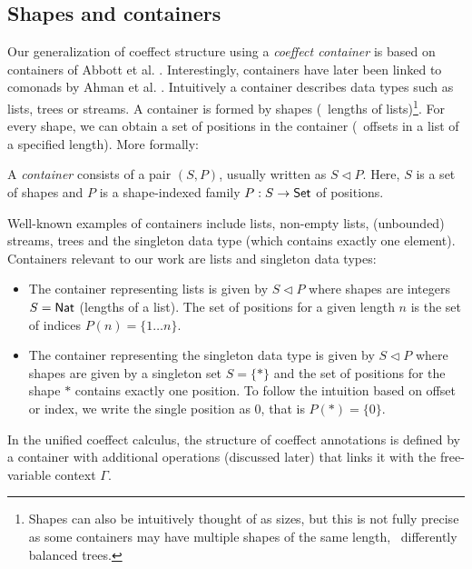 \subsection{Shapes and containers}
Our generalization of coeffect structure using a \emph{coeffect container} is based on containers of
Abbott et al. \cite{types-containers}. Interestingly, containers have later been linked
to comonads by Ahman et al. \cite{comonads-containers}. Intuitively a container describes data
types such as lists, trees or streams. A container is formed by shapes (\eg~lengths of
lists)\footnote{Shapes can also be intuitively thought of as sizes, but this is not fully precise
as some containers may have multiple shapes of the same length, \eg~differently balanced trees.}.
For every shape, we can obtain a set of positions in the container (\eg~offsets in a list of a
specified length). More formally:

\begin{definition}
A \emph{container} consists of a pair $(S,P)$, usually written as $S \triangleleft P$.
Here, $S$ is a set of shapes and $P$ is a shape-indexed family $P : S \rightarrow \textnormal{\sffamily Set}$
of positions.
\end{definition}

\noindent
Well-known examples of containers include lists, non-empty lists, (un\-boun\-ded) streams,
trees and the singleton data type (which contains exactly one element). Containers relevant
to our work are lists and singleton data types:

\begin{itemize}
\item The container representing lists is given by $S \triangleleft P$ where
  shapes are integers $S = \ident{Nat}$ (lengths of a list). The set of positions for a
  given length $n$ is the set of indices $P(n)= \{ 1 \ldots n \}$.

\item The container representing the singleton data type is given by $S \triangleleft P$ where
  shapes are given by a singleton set $S = \{ \ast \}$ and the set of positions for the
  shape $\ast$ contains exactly one position. To follow the intuition based on offset or
  index, we write the single position as $0$, that is $P(\ast) = \{ 0 \}$.
\end{itemize}

\noindent
In the unified coeffect calculus, the structure of coeffect annotations is defined by a
container with additional operations (discussed later) that links it with the free-variable
context $\Gamma$.

